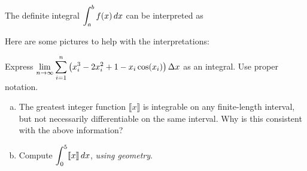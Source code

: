 \documentclass[notes]{subfiles}
\begin{document}
		\begin{rmk}
			The definite integral $\displaystyle \int_a^b f(x)\, dx$ can be interpreted as\vspace{5pt}
		\end{rmk}
		Here are some pictures to help with the interpretations:

			\newpage
			
		\begin{ex}
			Express $\displaystyle \lim_{n\to \infty} \sum_{i = 1}^n \left( x_i^3 - 2x_i^2 + 1 - x_i\cos(x_i)\right)\Delta x$ as an integral.  Use proper notation.
		\end{ex}
			
		\begin{ex}
			\begin{enumerate}[(a)]
				\item The greatest integer function $\llbracket x \rrbracket$ is integrable on any finite-length interval, but not necessarily differentiable on the same interval.  Why is this consistent with the above information?
					
				\item Compute $\displaystyle \int_0^5 \llbracket x \rrbracket\, dx$, \emph{using geometry}.
			
			\end{enumerate}
		\end{ex}
			\newpage
	
\end{document}
